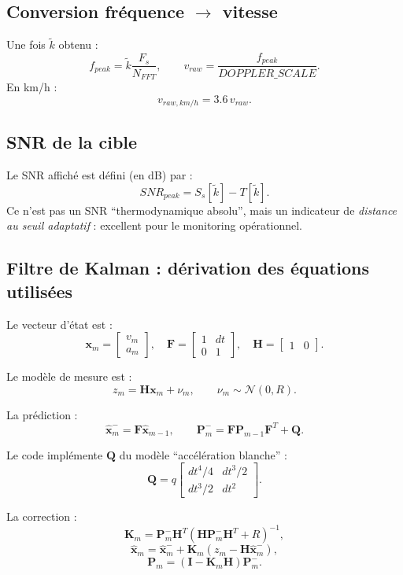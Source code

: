 \documentclass[a4paper,11pt]{article}
\begin{document}
\subsection{Conversion fr\'equence \(\rightarrow\) vitesse}

Une fois \(\tilde{k}\) obtenu :
\[
f_{peak}=\tilde{k}\frac{F_s}{N_{FFT}},
\qquad
v_{raw}=\frac{f_{peak}}{DOPPLER\_SCALE}.
\]
En km/h :
\[
v_{raw,km/h}=3.6\,v_{raw}.
\]

\subsection{SNR de la cible}

Le SNR affich\'e est d\'efini (en dB) par :
\[
SNR_{peak}=S_s[\tilde{k}]-T[\tilde{k}].
\]
Ce n'est pas un SNR ``thermodynamique absolu'', mais un indicateur de \emph{distance au seuil adaptatif} : excellent pour le monitoring op\'erationnel.

\subsection{Filtre de Kalman : d\'erivation des \'equations utilis\'ees}

Le vecteur d'\'etat est :
\[
\mathbf{x}_m=
\begin{bmatrix}
v_m\\a_m
\end{bmatrix},
\quad
\mathbf{F}=
\begin{bmatrix}
1&dt\\0&1
\end{bmatrix},
\quad
\mathbf{H}=
\begin{bmatrix}
1&0
\end{bmatrix}.
\]

Le mod\`ele de mesure est :
\[
z_m = \mathbf{H}\mathbf{x}_m + \nu_m,\qquad \nu_m\sim\mathcal{N}(0,R).
\]

La pr\'ediction :
\[
\hat{\mathbf{x}}^-_m = \mathbf{F}\hat{\mathbf{x}}_{m-1},
\qquad
\mathbf{P}^-_m = \mathbf{F}\mathbf{P}_{m-1}\mathbf{F}^T+\mathbf{Q}.
\]

Le code impl\'emente \(\mathbf{Q}\) du mod\`ele ``acc\'el\'eration blanche'' :
\[
\mathbf{Q}=q
\begin{bmatrix}
dt^4/4 & dt^3/2\\
dt^3/2 & dt^2
\end{bmatrix}.
\]

La correction :
\[
\mathbf{K}_m=\mathbf{P}^-_m\mathbf{H}^T(\mathbf{H}\mathbf{P}^-_m\mathbf{H}^T+R)^{-1},
\]
\[
\hat{\mathbf{x}}_m=\hat{\mathbf{x}}^-_m+\mathbf{K}_m(z_m-\mathbf{H}\hat{\mathbf{x}}^-_m),
\]
\[
\mathbf{P}_m=(\mathbf{I}-\mathbf{K}_m\mathbf{H})\mathbf{P}^-_m.
\]
\end{document}
